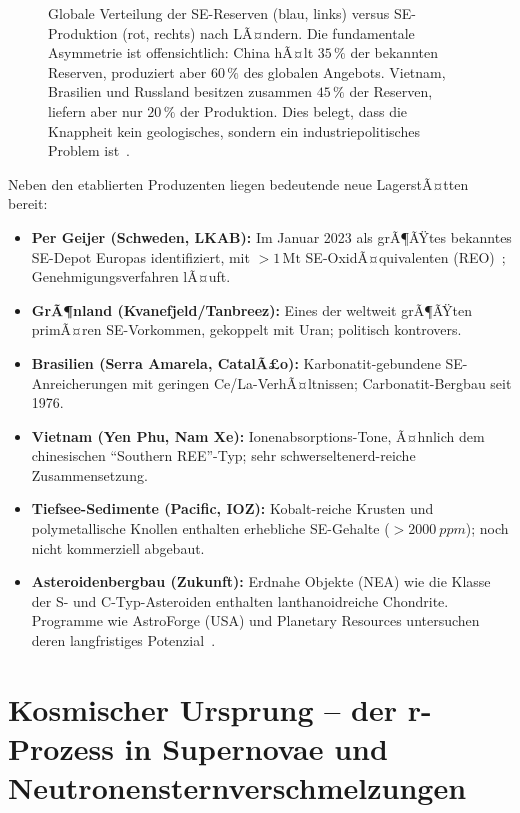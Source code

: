 ﻿\documentclass[12pt, a4paper]{report}
\theoremstyle{definition}
\theoremstyle{remark}
\begin{document}
\begin{figure}[htbp]
\caption{Globale Verteilung der SE-Reserven (blau, links) versus SE-Produktion
  (rot, rechts) nach LÃ¤ndern. Die fundamentale Asymmetrie ist offensichtlich:
  China hÃ¤lt $35\,\%$ der bekannten Reserven, produziert aber $60\,\%$ des
  globalen Angebots. Vietnam, Brasilien und Russland besitzen zusammen
  $45\,\%$ der Reserven, liefern aber nur $20\,\%$ der Produktion. Dies
  belegt, dass die Knappheit kein geologisches, sondern ein
  industriepolitisches Problem ist~\cite{usgs2024,massari2013}.}
\label{fig:re_reserven}
\end{figure}

Neben den etablierten Produzenten liegen bedeutende neue LagerstÃ¤tten bereit:
\begin{itemize}
  \item \textbf{Per Geijer (Schweden, LKAB):} Im Januar 2023 als grÃ¶ÃŸtes
        bekanntes SE-Depot Europas identifiziert, mit $>1\,\text{Mt}$ SE-OxidÃ¤quivalenten
        (REO)~\cite{lkab2023}; Genehmigungsverfahren lÃ¤uft.
  \item \textbf{GrÃ¶nland (Kvanefjeld/Tanbreez):} Eines der weltweit grÃ¶ÃŸten
        primÃ¤ren SE-Vorkommen, gekoppelt mit Uran; politisch kontrovers.
  \item \textbf{Brasilien (Serra Amarela, CatalÃ£o):} Karbonatit-gebundene
        SE-Anreicherungen mit geringen Ce/La-VerhÃ¤ltnissen; Carbonatit-Bergbau
        seit 1976.
  \item \textbf{Vietnam (Yen Phu, Nam Xe):} Ionenabsorptions-Tone, Ã¤hnlich
        dem chinesischen ``Southern REE''-Typ; sehr schwerseltenerd-reiche
        Zusammensetzung.
  \item \textbf{Tiefsee-Sedimente (Pacific, IOZ):} Kobalt-reiche Krusten und
        polymetallische Knollen enthalten erhebliche SE-Gehalte
        ($>\SI{2000}{ppm}$); noch nicht kommerziell abgebaut.
  \item \textbf{Asteroidenbergbau (Zukunft):} Erdnahe Objekte (NEA) wie die
        Klasse der S- und C-Typ-Asteroiden enthalten lanthanoidreiche
        Chondrite. Programme wie AstroForge (USA) und Planetary Resources
        untersuchen deren langfristiges Potenzial~\cite{iea2024}.
\end{itemize}

\section{Kosmischer Ursprung -- der r-Prozess in Supernovae und
            Neutronensternverschmelzungen}
\label{ssec:re_kosmos}
\end{document}
